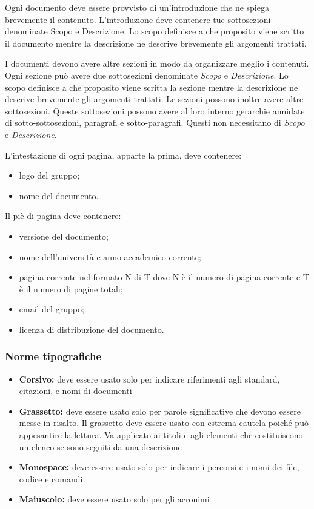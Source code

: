 \documentclass[12pt,a4paper]{article}
\begin{document}
Ogni documento deve essere provvisto di un'introduzione che ne spiega brevemente il contenuto. L'introduzione deve contenere tue sottosezioni denominate Scopo e Descrizione. Lo scopo definisce a che proposito viene scritto il documento mentre la descrizione ne descrive brevemente gli argomenti trattati.

I documenti devono avere altre sezioni in modo da organizzare meglio i contenuti. Ogni sezione può avere due sottosezioni denominate \textit{Scopo} e \textit{Descrizione}. Lo scopo definisce a che proposito viene scritta la sezione mentre la descrizione ne descrive brevemente gli argomenti trattati. Le sezioni possono inoltre avere altre sottosezioni. Queste sottosezioni possono avere al loro interno gerarchie annidate di sotto-sottosezioni,  paragrafi e sotto-paragrafi. Questi non necessitano di \textit{Scopo} e \textit{Descrizione}.

L'intestazione di ogni pagina, apparte la prima, deve contenere:
\begin{itemize}
	\item logo del gruppo;
	\item nome del documento.
\end{itemize}
Il piè di pagina deve contenere:
\begin{itemize}
	\item versione del documento;
	\item nome dell'università e anno accademico corrente;
	\item pagina corrente nel formato N di T dove N è il numero di pagina corrente e T è il numero di pagine totali;
	\item email del gruppo;
	\item licenza di distribuzione del documento.
\end{itemize}

\subsubsection{Norme tipografiche}\label{norme tipografiche}

\begin{itemize}
	\item \textbf{Corsivo:} deve essere usato solo per indicare riferimenti agli standard, citazioni,  e nomi di documenti
	\item \textbf{Grassetto:} deve essere usato solo per parole significative che devono essere messe in risalto. Il grassetto deve essere usato con estrema cautela poiché può appesantire la lettura. Va applicato ai titoli e agli elementi che costituiscono un elenco se sono seguiti da una descrizione
	\item \textbf{Monospace:} deve essere usato solo per indicare i percorsi e i nomi dei file, codice e comandi
	\item \textbf{Maiuscolo:} deve essere usato solo per gli acronimi
\end{itemize}
\end{document}
